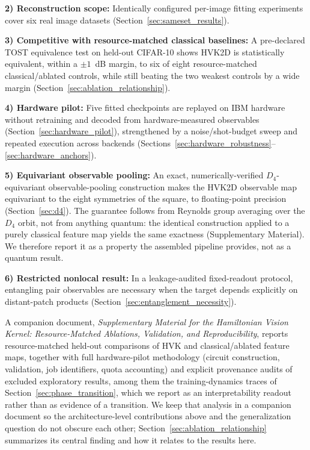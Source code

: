\documentclass[journal]{IEEEtran}
\begin{document}
\noindent\textbf{2) Reconstruction scope:} Identically configured per-image fitting experiments cover six real image datasets (Section~\ref{sec:sameset_results}).

\noindent\textbf{3) Competitive with resource-matched classical baselines:} A pre-declared TOST equivalence test on held-out CIFAR-10 shows HVK2D is statistically equivalent, within a $\pm1$~dB margin, to six of eight resource-matched classical/ablated controls, while still beating the two weakest controls by a wide margin (Section~\ref{sec:ablation_relationship}).

\noindent\textbf{4) Hardware pilot:} Five fitted checkpoints are replayed on IBM hardware without retraining and decoded from hardware-measured observables (Section~\ref{sec:hardware_pilot}), strengthened by a noise/shot-budget sweep and repeated execution across backends (Sections~\ref{sec:hardware_robustness}--\ref{sec:hardware_anchors}).

\noindent\textbf{5) Equivariant observable pooling:} An exact, numerically-verified $D_4$-equivariant observable-pooling construction makes the HVK2D observable map equivariant to the eight symmetries of the square, to floating-point precision (Section~\ref{sec:d4}). The guarantee follows from Reynolds group averaging over the $D_4$ orbit, not from anything quantum: the identical construction applied to a purely classical feature map yields the same exactness (Supplementary Material). We therefore report it as a property the assembled pipeline provides, not as a quantum result.

\noindent\textbf{6) Restricted nonlocal result:} In a leakage-audited fixed-readout protocol, entangling pair observables are necessary when the target depends explicitly on distant-patch products (Section~\ref{sec:entanglement_necessity}).

A companion document, \textit{Supplementary Material for the Hamiltonian Vision Kernel: Resource-Matched Ablations, Validation, and Reproducibility}, reports resource-matched held-out comparisons of HVK and classical/ablated feature maps, together with full hardware-pilot methodology (circuit construction, validation, job identifiers, quota accounting) and explicit provenance audits of excluded exploratory results, among them the training-dynamics traces of Section~\ref{sec:phase_transition}, which we report as an interpretability readout rather than as evidence of a transition. We keep that analysis in a companion document so the architecture-level contributions above and the generalization question do not obscure each other; Section~\ref{sec:ablation_relationship} summarizes its central finding and how it relates to the results here.
\end{document}
